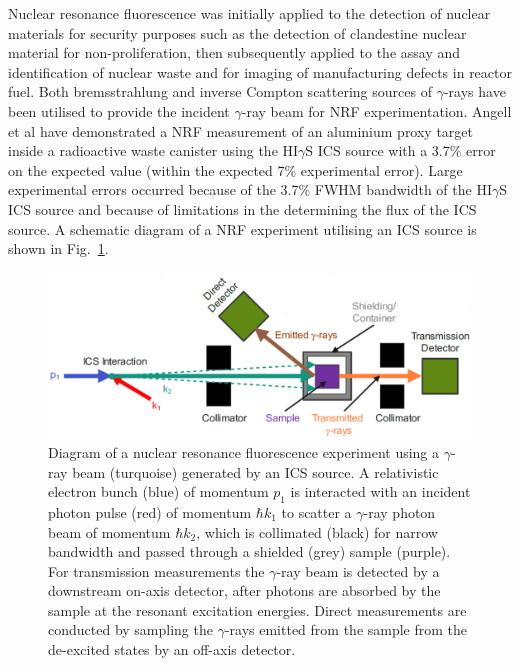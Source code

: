 \documentclass[../main.tex]{subfiles}
\begin{document}
Nuclear resonance fluorescence was initially applied to the detection of nuclear materials for security purposes such as the detection of clandestine nuclear material \cite{bertozzi2005nuclear,pruet2006detecting,geddes2017impact} for non-proliferation, then subsequently applied to the assay and identification of nuclear waste \cite{hayakawa2010nondestructive,angell2015demonstration,bolind2015states} and for imaging of manufacturing defects in reactor fuel. Both bremsstrahlung \cite{bertozzi2005nuclear} and inverse Compton scattering sources \cite{angell2015demonstration} of $\gamma$-rays have been utilised to provide the incident $\gamma$-ray beam for NRF experimentation. Angell et al \cite{angell2015demonstration} have demonstrated a NRF measurement of an aluminium proxy target inside a radioactive waste canister using the HI$\gamma$S ICS source with a 3.7\% error on the expected value (within the expected 7\% experimental error). Large experimental errors occurred because of the 3.7\% FWHM bandwidth of the HI$\gamma$S ICS source and because of limitations in the determining the flux of the ICS source. A schematic diagram of a NRF experiment utilising an ICS source is shown in Fig.~\ref{fig:NRF_diagram}.
\begin{figure}[!h]
\centering
\includegraphics[width=\textwidth]{Figures/DIANA_Inverse_Compton_Source_Design/NRF_diagram_fixed.pdf}
\caption{Diagram of a nuclear resonance fluorescence experiment using a $\gamma$-ray beam (turquoise) generated by an ICS source. A relativistic electron bunch (blue) of momentum $p_{1}$ is interacted with an incident photon pulse (red) of momentum $\hbar k_{1}$ to scatter a $\gamma$-ray photon beam of momentum $\hbar k_{2}$, which is collimated (black) for narrow bandwidth and passed through a shielded (grey) sample (purple).  For transmission measurements the $\gamma$-ray beam is detected by a downstream on-axis detector, after photons are absorbed by the sample at the resonant excitation energies. Direct measurements are conducted by sampling the $\gamma$-rays emitted from the sample from the de-excited states by an off-axis detector.}
\label{fig:NRF_diagram}
\end{figure}
\end{document}
